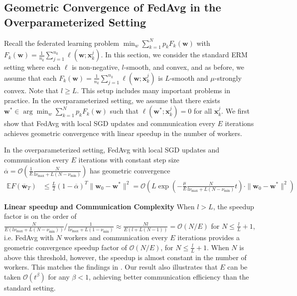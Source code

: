 \subsection{Geometric Convergence of FedAvg in the Overparameterized Setting}
Recall the federated learning problem $\min_{w}\sum_{k=1}^{N}p_{k}F_{k}(\mathbf{w})$
with $F_{k}(\mathbf{w})=\frac{1}{n_{k}}\sum_{j=1}^{n_{k}}\ell(\mathbf{w};\mathbf{x}_{k}^{j})$.
In this section, we consider the standard ERM setting where each $\ell$
is non-negative, $l$-smooth, and convex, and as before, we assume
that each $F_{k}(\mathbf{w})=\frac{1}{n_{k}}\sum_{j=1}^{n_{k}}\ell(\mathbf{w};\mathbf{x}_{k}^{j})$
is $L$-smooth and $\mu$-strongly convex. Note that $l\geq L$. This
setup includes many important problems in practice. In the overparameterized
setting, we assume that there exists $\mathbf{w}^{\ast}\in\arg\min_{w}\sum_{k=1}^{N}p_{k}F_{k}(\mathbf{w})$
such that $\ell(\mathbf{w}^{\ast};\mathbf{x}_{k}^{j})=0$ for all
$\mathbf{x}_{k}^{j}$. We first show that FedAvg with local SGD updates
and communication every $E$ iterations achieves geometric convergence
with linear speedup in the number of workers. 
\begin{theorem}
	\label{thm:overparameterized_general}In the overparameterized setting,
	FedAvg with local SGD updates and communication every $E$ iterations
	with constant step size $\overline{\alpha}=\mathcal{O}(\frac{1}{E}\frac{N}{l\nu_{\max}+L(N-\nu_{\min})})$
	has geometric convergence
	\begin{align*}
	\mathbb{E}F(\overline{\mathbf{w}}_{T}) & \leq\frac{L}{2}(1-\overline{\alpha})^{T}\|\mathbf{w}_{0}-\mathbf{w}^{\ast}\|^{2}=\mathcal{O}\left(L\exp(-\frac{\mu}{E}\frac{N}{l\nu_{\max}+L(N-\nu_{\min})}t)\cdot\|\mathbf{w}_{0}-\mathbf{w}^{\ast}\|^{2}\right)
	\end{align*}
\end{theorem}
%
\textbf{Linear speedup and Communication Complexity} When $l>L$,
the speedup factor is on the order of $\frac{N}{E(l\nu_{\max}+L(N-\nu_{\min}))}/\frac{1}{l\nu_{\max}+L(1-\nu_{\min})}\approx\frac{Nl}{E(l+L(N-1))}=\mathcal{O}(N/E)$
for $N\leq\frac{l}{L}+1$, i.e. FedAvg with $N$ workers and communication
every $E$ iterations provides a geometric convergence speedup factor
of $\mathcal{O}(N/E)$, for $N\leq\frac{l}{L}+1$. When $N$ is above
this threshold, however, the speedup is almost constant in the number
of workers. This matches the findings in \cite{ma2017power}. Our
result also illustrates that $E$ can be taken $\mathcal{O}(t^{\beta})$
for any $\beta<1$, achieving better communication efficiency than
the standard setting. 

